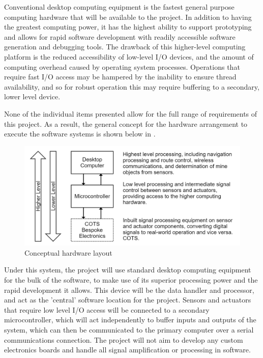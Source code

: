 \documentclass[main.tex]{subfiles}
\begin{document}
\begin{itemize}
Conventional desktop computing equipment is the fastest general purpose computing hardware that will be available to the project. In addition to having the greatest computing power, it has the highest ability to support prototyping and allows for rapid software development with readily accessible software generation and debugging tools. The drawback of this higher-level computing platform is the reduced accessibility of low-level I/O devices, and the amount of computing overhead caused by operating system processes. Operations that require fast I/O access may be hampered by the inability to ensure thread availability, and so for robust operation this may require buffering to a secondary, lower level device.
\end{itemize}

None of the individual items presented allow for the full range of requirements of this project. As a result, the general concept for the hardware arrangement to execute the software systems is shown below in .
\begin{figure}[ht]
\includegraphics[width = \textwidth]{4-ConceptDesign/electronics.png}
\centering
\caption{Conceptual hardware layout} 
\end{figure}

Under this system, the project will use standard desktop computing equipment for the bulk of the software, to make use of its superior processing power and the rapid development it allows. This device will be the data handler and processor, and act as the 'central' software location for the project. Sensors and actuators that require low level I/O access will be connected to a secondary microcontroller, which will act independently to buffer inputs and outputs of the system, which can then be communicated to the primary computer over a serial communications connection. The project will not aim to develop any custom electronics boards and handle all signal amplification or processing in software.
\end{document}
